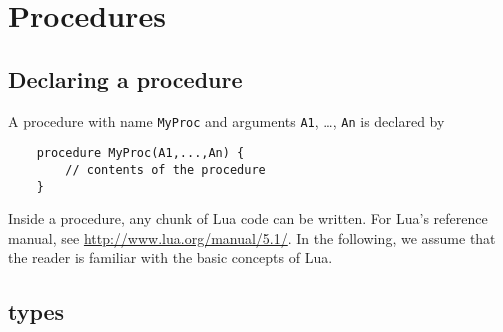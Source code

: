 \documentclass[a4]{article}
\begin{document}
\section{Procedures}

\subsection{Declaring a procedure}

A procedure with name {\tt MyProc} and arguments {\tt A1}, \ldots, {\tt An} is declared by 
\begin{lstlisting}
	procedure MyProc(A1,...,An) {
		// contents of the procedure
	}
\end{lstlisting}
Inside a procedure, any chunk of Lua code can be written. For Lua's reference manual, see \url{http://www.lua.org/manual/5.1/}. In the following, we assume that the reader is familiar with the basic concepts of Lua.

\subsection{\idp types}
\end{document}

